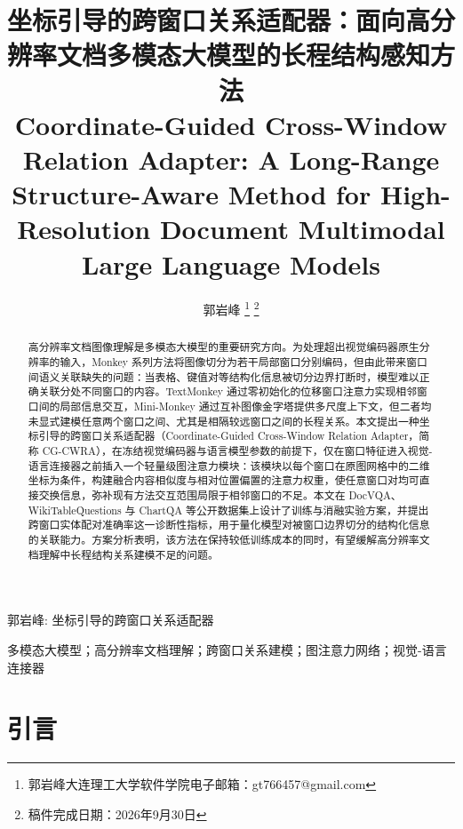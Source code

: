 \documentclass[journal]{IEEEtran}
\begin{document}
\title{坐标引导的跨窗口关系适配器：面向高分辨率文档多模态大模型的长程结构感知方法\\
\large Coordinate-Guided Cross-Window Relation Adapter: A Long-Range Structure-Aware Method for High-Resolution Document Multimodal Large Language Models}

\author{郭岩峰
\thanks{郭岩峰\quad 大连理工大学软件学院\quad 电子邮箱：gt766457@gmail.com}
\thanks{稿件完成日期：2026年9月30日}}

%
{郭岩峰: 坐标引导的跨窗口关系适配器}

\maketitle

\begin{abstract}
高分辨率文档图像理解是多模态大模型的重要研究方向。为处理超出视觉编码器原生分辨率的输入，Monkey 系列方法将图像切分为若干局部窗口分别编码，但由此带来窗口间语义关联缺失的问题：当表格、键值对等结构化信息被切分边界打断时，模型难以正确关联分处不同窗口的内容。TextMonkey 通过零初始化的位移窗口注意力实现相邻窗口间的局部信息交互，Mini-Monkey 通过互补图像金字塔提供多尺度上下文，但二者均未显式建模任意两个窗口之间、尤其是相隔较远窗口之间的长程关系。本文提出一种坐标引导的跨窗口关系适配器（Coordinate-Guided Cross-Window Relation Adapter，简称 CG-CWRA），在冻结视觉编码器与语言模型参数的前提下，仅在窗口特征进入视觉-语言连接器之前插入一个轻量级图注意力模块：该模块以每个窗口在原图网格中的二维坐标为条件，构建融合内容相似度与相对位置偏置的注意力权重，使任意窗口对均可直接交换信息，弥补现有方法交互范围局限于相邻窗口的不足。本文在 DocVQA、WikiTableQuestions 与 ChartQA 等公开数据集上设计了训练与消融实验方案，并提出跨窗口实体配对准确率这一诊断性指标，用于量化模型对被窗口边界切分的结构化信息的关联能力。方案分析表明，该方法在保持较低训练成本的同时，有望缓解高分辨率文档理解中长程结构关系建模不足的问题。
\end{abstract}

\begin{IEEEkeywords}
多模态大模型；高分辨率文档理解；跨窗口关系建模；图注意力网络；视觉-语言连接器
\end{IEEEkeywords}

\IEEEpeerreviewmaketitle

\section{引言}
\end{document}
